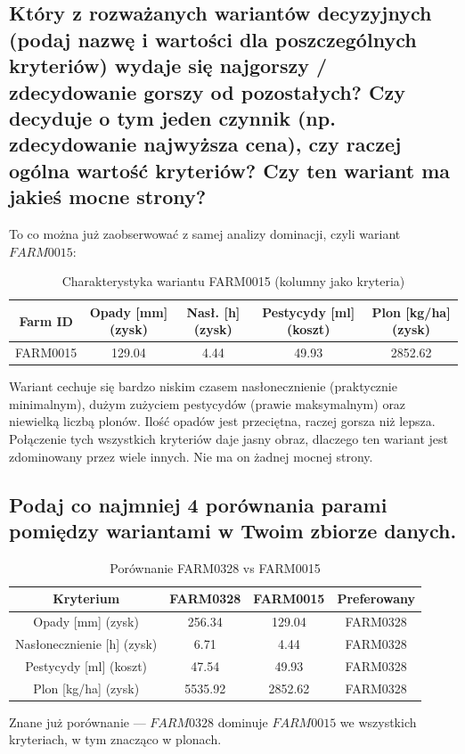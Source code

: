 \documentclass[11pt]{article}
\begin{document}
\subsection{Który z rozważanych wariantów decyzyjnych (podaj nazwę i wartości dla poszczególnych kryteriów) wydaje się najgorszy / zdecydowanie gorszy od pozostałych? Czy decyduje o tym jeden czynnik (np. zdecydowanie najwyższa cena), czy raczej ogólna wartość kryteriów? Czy ten wariant ma jakieś mocne strony?}
To co można już zaobserwować z samej analizy dominacji, czyli wariant $FARM0015$:
\begin{table}[H]
\centering
\caption{Charakterystyka wariantu FARM0015 (kolumny jako kryteria)}
\begin{tabular}{|c||c|c|c|c|}
\hline
\textbf{Farm ID} & \textbf{Opady [mm] (zysk)} & \textbf{Nasł. [h] (zysk)} & \textbf{Pestycydy [ml] (koszt)} & \textbf{Plon [kg/ha] (zysk)} \\
\hline
FARM0015 & 129.04 & 4.44 & 49.93 & 2852.62 \\
\hline
\end{tabular}
\end{table}

Wariant cechuje się bardzo niskim czasem nasłonecznienie (praktycznie minimalnym), dużym zużyciem pestycydów (prawie maksymalnym) oraz niewielką liczbą plonów. Ilość opadów jest przeciętna, raczej gorsza niż lepsza. Połączenie tych wszystkich kryteriów daje jasny obraz, dlaczego ten wariant jest zdominowany przez wiele innych. Nie ma on żadnej mocnej strony.

\subsection{Podaj co najmniej 4 porównania parami pomiędzy wariantami w Twoim zbiorze danych.}
\begin{table}[H]
\centering
\begin{tabular}{|c||c|c|c|}
\hline
\textbf{Kryterium} & \textbf{FARM0328} & \textbf{FARM0015} & \textbf{Preferowany} \\
\hline
Opady [mm] (zysk)           & 256.34 & 129.04 & FARM0328 \\ \hline
Nasłonecznienie [h] (zysk) & 6.71   & 4.44   & FARM0328 \\ \hline
Pestycydy [ml] (koszt)     & 47.54  & 49.93  & FARM0328 \\ \hline
Plon [kg/ha] (zysk)       & 5535.92& 2852.62& FARM0328 \\
\hline
\end{tabular}
\caption{Porównanie FARM0328 vs FARM0015}
\end{table}
Znane już porównanie --- $FARM0328$ dominuje $FARM0015$ we wszystkich kryteriach, w tym znacząco w plonach.
\end{document}
